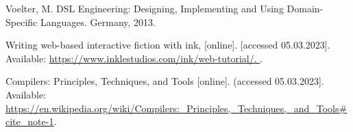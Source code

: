 \begin{thebibliography}{99}
\singlespace \normalsize

  Voelter, M. DSL Engineering: Designing, Implementing and Using Domain-Specific Languages. Germany, 2013.

  Writing web-based interactive fiction with ink, [online]. [accessed 05.03.2023]. Available: 
  \url{https://www.inklestudios.com/ink/web-tutorial/. }.

  Compilers: Principles, Techniques, and Tools [online]. (accessed 05.03.2023]. Available: 
  \url{https://en.wikipedia.org/wiki/Compilers:_Principles,_Techniques,_and_Tools#cite_note-1}.
  
\end{thebibliography}


